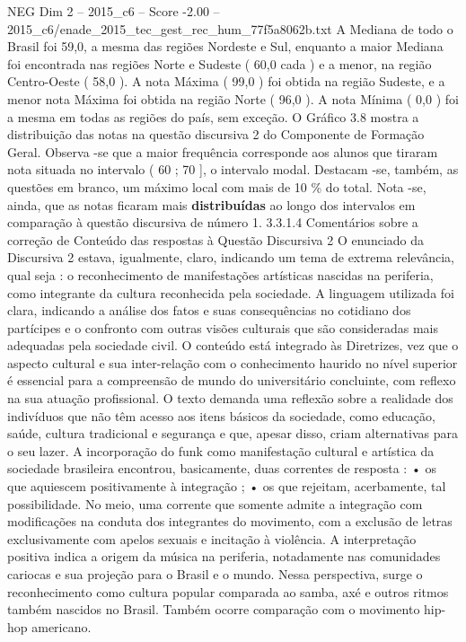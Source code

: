 \begin{textsample}{NEG Dim 2 – 2015\_c6 – Score -2.00 – 2015\_c6/enade\_2015\_tec\_gest\_rec\_hum\_77f5a8062b.txt}
A Mediana de todo o Brasil foi 59,0, a mesma das regiões Nordeste e Sul, enquanto a maior Mediana foi encontrada nas regiões Norte e Sudeste ( 60,0 cada ) e a menor, na região Centro-Oeste ( 58,0 ).
A nota Máxima ( 99,0 ) foi obtida na região Sudeste, e a menor nota Máxima foi obtida na região Norte ( 96,0 ).
A nota Mínima ( 0,0 ) foi a mesma em todas as regiões do país, sem exceção.
O Gráfico 3.8 mostra a distribuição das notas na questão discursiva 2 do Componente de Formação Geral.
Observa -se que a maior frequência corresponde aos alunos que tiraram nota situada no intervalo ( 60 ; 70 ], o intervalo modal.
Destacam -se, também, as questões em branco, um máximo local com mais de 10 \% do total.
Nota -se, ainda, que as notas ficaram mais \textbf{distribuídas} ao longo dos intervalos em comparação à questão discursiva de número 1. 3.3.1.4 Comentários sobre a correção de Conteúdo das respostas à Questão Discursiva 2 O enunciado da Discursiva 2 estava, igualmente, claro, indicando um tema de extrema relevância, qual seja : o reconhecimento de manifestações artísticas nascidas na periferia, como integrante da cultura reconhecida pela sociedade.
A linguagem utilizada foi clara, indicando a análise dos fatos e suas consequências no cotidiano dos partícipes e o confronto com outras visões culturais que são consideradas mais adequadas pela sociedade civil.
O conteúdo está integrado às Diretrizes, vez que o aspecto cultural e sua inter-relação com o conhecimento haurido no nível superior é essencial para a compreensão de mundo do universitário concluinte, com reflexo na sua atuação profissional.
O texto demanda uma reflexão sobre a realidade dos indivíduos que não têm acesso aos itens básicos da sociedade, como educação, saúde, cultura tradicional e segurança e que, apesar disso, criam alternativas para o seu lazer.
A incorporação do funk como manifestação cultural e artística da sociedade brasileira encontrou, basicamente, duas correntes de resposta : • os que aquiescem positivamente à integração ; • os que rejeitam, acerbamente, tal possibilidade.
No meio, uma corrente que somente admite a integração com modificações na conduta dos integrantes do movimento, com a exclusão de letras exclusivamente com apelos sexuais e incitação à violência.
A interpretação positiva indica a origem da música na periferia, notadamente nas comunidades cariocas e sua projeção para o Brasil e o mundo.
Nessa perspectiva, surge o reconhecimento como cultura popular comparada ao samba, axé e outros ritmos também nascidos no Brasil.
Também ocorre comparação com o movimento hip-hop americano.

\end{textsample}
